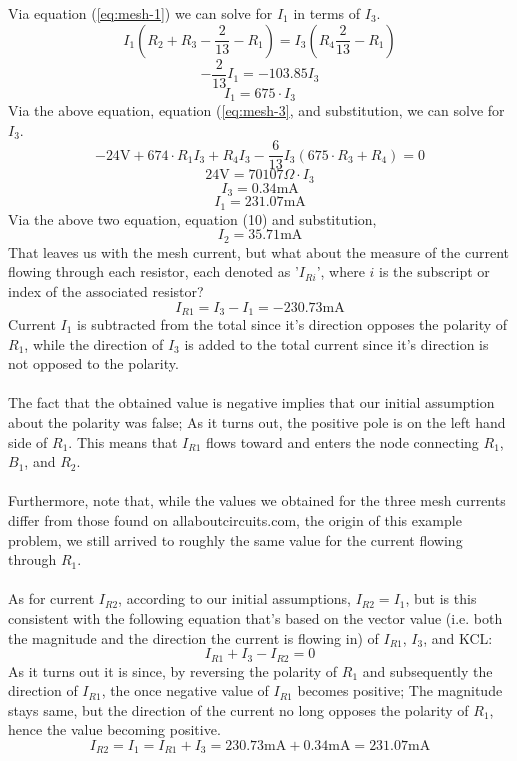 \documentclass{article}
\begin{document}
	Via equation (\ref{eq:mesh-1}) we can solve for $I_1$ in terms of $I_3$.
	$$ I_1\left(R_2+R_3-\frac{2}{13}-R_1 \right)=I_3 \left( R_4 
	\frac{2}{13}-R_1\right)$$
	$$ -\frac{2}{13}I_1 = -103.85I_3$$
	\begin{equation}\label{eq:mesh_1-in-mesh_3}
		I_1 = 675 \cdot I_3
	\end{equation}
	Via the above equation, equation (\ref{eq:mesh-3}, and substitution, we can 
	solve for $I_3$.
	$$ -24\text{V} + 674\cdot R_1I_3 + R_4I_3 - \frac{6}{13}I_3(675\cdot 
	R_3+R_4)=0$$
	$$ 24\text{V} = 70107 \Omega \cdot I_3$$
	\begin{equation}\label{eq:meshcur_3}
		I_3 = 0.34\text{mA}
	\end{equation}
	\begin{equation}\label{eq:meshcur_1}
		I_1 = 231.07\text{mA}
	\end{equation}
	Via the above two equation, equation (10) and substitution,
	\begin{equation}\label{key}
	I_2 = 35.71\text{mA}
	\end{equation}
	That leaves us with the mesh current, but what about the measure of the 
	current flowing through each resistor, each denoted as '$I_{Ri}$', where 
	$i$ is the subscript or index of the associated resistor?
	$$ I_{R1} = I_3 - I_1 = -230.73\text{mA}$$
	Current $I_1$ is subtracted from the total since it's direction opposes the 
	polarity of $R_1$, while the direction of $I_3$ is added to the total 
	current since it's direction is not opposed to the polarity. \\ \\
	The fact that the obtained value is negative implies that our initial 
	assumption about the polarity was false;  As it turns out, the positive 
	pole is on the left hand side of $R_1$.  This means that $I_{R1}$ flows 
	toward and enters the node connecting $R_1$, $B_1$, and $R_2$. \\ \\
	Furthermore, note that, while the values we obtained for the three mesh 
	currents differ from those found on allaboutcircuits.com, the origin of 
	this example problem, we still arrived to roughly the same value for the 
	current flowing through $R_1$. \\ \\
	As for current $I_{R2}$, according to our initial assumptions, 
	$I_{R2}=I_1$, but is this consistent with the following equation that's 
	based on the vector value (i.e. both the magnitude and the direction the 
	current is flowing in) of $I_{R1}$, $I_3$, and KCL:
	$$ I_{R1} + I_3 - I_{R2} = 0$$
	As it turns out it is since, by reversing the polarity of $R_1$ and 
	subsequently the direction of $I_{R1}$, the once negative value of $I_{R1}$ 
	becomes positive;  The magnitude stays same, but the direction of the 
	current no long opposes the polarity of $R_1$, hence the value becoming 
	positive.
	$$ I_{R2} = I_1 = I_{R1} + I_3 = 230.73\text{mA} + 0.34\text{mA} = 
	231.07\text{mA}$$
\end{document}
